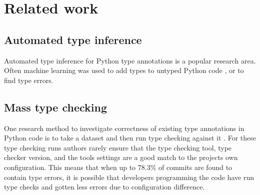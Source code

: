 \chapter{Related work\label{related_work}}

\section{Automated type inference}
Automated type inference for Python type annotations is a popular research area. Often machine learning was used to add types to untyped Python code\citetemp
, or to find type errors\citetemp. 

\section{Mass type checking}

One research method to investigate correctness of existing type annotations in Python code is to take a dataset and then run type checking against it \cite{rak-amnouykit_taleoftwo_2020}\cite{di_grazia_evolution_2022}. For these type checking runs authors rarely ensure that the type checking tool, type checker version, and the tools settings are a good match to the projects own configuration. This means that when up to 78.3\% of commits are found to contain type errors\cite{di_grazia_evolution_2022}, it is possible that developers programming the code have run type checks and gotten less errors due to configuration difference.


